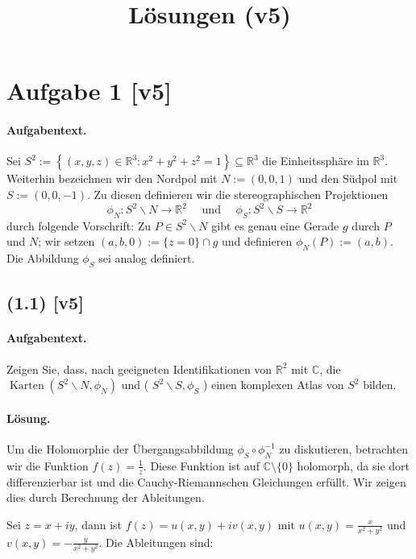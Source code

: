 \documentclass[11pt,a4paper]{article}
\title{Lösungen (v5)}
\date{}
\begin{document}
\maketitle

\section*{Aufgabe 1 [v5]}
\paragraph{Aufgabentext.}
Sei $S^2:=\left\{(x, y, z) \in \mathbb{R}^3: x^2+y^2+z^2=1\right\} \subseteq \mathbb{R}^3$ die Einheitssphäre im $\mathbb{R}^3$. Weiterhin bezeichnen wir den Nordpol mit $N:=(0,0,1)$ und den Südpol mit $S:=(0,0,-1)$. Zu diesen definieren wir die stereographischen Projektionen
$$
\phi_N: S^2 \backslash N \rightarrow \mathbb{R}^2 \quad \text { und } \quad \phi_S: S^2 \backslash S \rightarrow \mathbb{R}^2
$$
durch folgende Vorschrift: Zu $P \in S^2 \backslash N$ gibt es genau eine Gerade $g$ durch $P$ und $N$; wir setzen $(a, b, 0):=\{z=0\} \cap g$ und definieren $\phi_N(P):=(a, b)$. Die Abbildung $\phi_S$ sei analog definiert.

\subsection*{(1.1) [v5]}
\paragraph{Aufgabentext.}
Zeigen Sie, dass, nach geeigneten Identifikationen von $\mathbb{R}^2$ mit $\mathbb{C}$, die $\operatorname{Karten}\left(S^2 \backslash N, \phi_N\right)$ und ( $S^2 \backslash S, \phi_S$ ) einen komplexen Atlas von $S^2$ bilden.

\paragraph{Lösung.}
Um die Holomorphie der Übergangsabbildung $\phi_S \circ \phi_N^{-1}$ zu diskutieren, betrachten wir die Funktion $f(z) = \frac{1}{z}$. Diese Funktion ist auf $\mathbb{C} \setminus \{0\}$ holomorph, da sie dort differenzierbar ist und die Cauchy-Riemannschen Gleichungen erfüllt. Wir zeigen dies durch Berechnung der Ableitungen.

Sei $z = x + iy$, dann ist $f(z) = u(x, y) + iv(x, y)$ mit $u(x, y) = \frac{x}{x^2 + y^2}$ und $v(x, y) = -\frac{y}{x^2 + y^2}$. Die Ableitungen sind:
\end{document}
